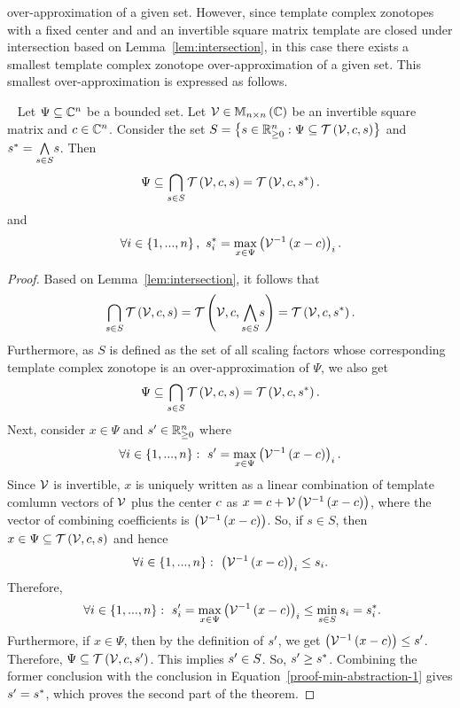 over-approximation of a given set.  However, since template complex
zonotopes with a fixed center and and an invertible square matrix
template are closed under intersection based on
Lemma~\ref{lem:intersection}, in this case there exists a smallest
template complex zonotope over-approximation of a given set.  This
smallest over-approximation is expressed as follows.
%
\begin{theorem}~\label{thm:min-abstraction}
Let $\Psi\subseteq\mathbb{C}^n$ be a bounded set.  Let
$\mathcal{V}\in\mathbb{M}_{n\times n}\left(\mathbb{C}\right)$ be an invertible square matrix and
$c\in\mathbb{C}^n$.  Consider the set $S=\left\{s\in\mathbb{R}_{\geq
0}^n:\Psi\subseteq\mathit{\operatorname{\mathcal{T}}}\left(\mathcal{V},c,s\right)\right\}$ and
$s^*=\underset{s\in S}{\bigwedge} s$.  Then
%
\begin{equation}
\Psi\subseteq\bigcap_{s\in S}\mathit{\operatorname{\mathcal{T}}}\left(\mathcal{V},c,s\right)=\mathit{\operatorname{\mathcal{T}}}\left(\mathcal{V},c,s^*\right).
\end{equation}
%
and
%
\begin{equation}
\forall i\in\left\{1,...,n\right\},~s^*_i=\max_{x\in\Psi}\left({\mathcal{V}}^{-1}\left(x-c\right)\right)_i.
\end{equation}
%
\end{theorem}
%
\begin{proof}
Based on Lemma~\ref{lem:intersection}, it follows that
%
\[
\bigcap_{s\in
S}\mathit{\operatorname{\mathcal{T}}}\left(\mathcal{V},c,s\right)=\mathit{\operatorname{\mathcal{T}}}\left(\mathcal{V},c,\underset{s\in
S}{\bigwedge}s\right)=\mathit{\operatorname{\mathcal{T}}}\left(\mathcal{V},c,s^*\right).
\]
%
Furthermore, as $S$ is defined as the set of all scaling factors
whose corresponding template complex zonotope is an over-approximation
of $\Psi$, we also get
%
\[
\Psi\subseteq\bigcap_{s\in S}\mathit{\operatorname{\mathcal{T}}}\left(\mathcal{V},c,s\right)=\mathit{\operatorname{\mathcal{T}}}\left(\mathcal{V},c,s^*\right).
\]
%
Next, consider $x\in\Psi$ and $s^\prime\in\mathbb{R}_{\geq 0}^n$ where
%
\[
\forall
i\in\left\{1,...,n\right\}:~s^\prime=\max_{x\in\Psi}\left({\mathcal{V}}^{-1}\left(x-c\right)\right)_i.
\]
%
Since $\mathcal{V}$ is invertible, $x$ is uniquely written as a linear
combination of template comlumn vectors of $\mathcal{V}$ plus the center
$c$ as $x=c+\mathcal{V}\left({\mathcal{V}}^{-1}\left(x-c\right)\right)$, where the
vector of combining coefficients is
$\left({\mathcal{V}}^{-1}\left(x-c\right)\right)$.  So, if $s\in S$, then 
$x\in\Psi\subseteq\mathit{\operatorname{\mathcal{T}}}\left(\mathcal{V},c,s\right)$ and hence \[\forall
i\in\left\{1,...,n\right\}:~\left({\mathcal{V}}^{-1}\left(x-c\right)\right)_i\leq s_i.\]
Therefore,
%
\begin{equation}~\label{proof-min-abstraction-1}
\forall
i\in\left\{1,...,n\right\}:~s^\prime_i=\max_{x\in\Psi}\left({\mathcal{V}}^{-1}\left(x-c\right)\right)_i\leq\min_{s\in
S}s_i=s^*_i.
\end{equation}
%
Furthermore, if $x\in\Psi$, then by the definition of $s^\prime$, we
get $\left({\mathcal{V}}^{-1}\left(x-c\right)\right)\leq s^\prime$.  Therefore,
$\Psi\subseteq\mathit{\operatorname{\mathcal{T}}}\left(\mathcal{V},c,s^\prime\right)$.  This implies
$s^\prime\in S$.  So, $s^\prime\geq s^*$.  Combining the
former conclusion with the conclusion in
Equation~\ref{proof-min-abstraction-1} gives $s^\prime=s^*$,
which proves the second part of the theorem.
\end{proof}

